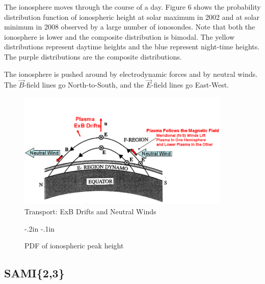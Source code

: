 \documentclass[12pt]{article}
\begin{document}
    The ionosphere moves through the course of a day. Figure 6 shows the probability distribution function of ionospheric height at solar maximum in 2002 and at solar minimum in 2008 observed by a large number of ionosondes. Note that both the ionosphere is lower and the composite distribution is bimodal. The yellow distributions represent daytime heights and the blue represent night-time heights. The purple distributions are the composite distributions.

The ionosphere is pushed around by electrodynamic forces and by neutral winds. The $\vec B$-field lines go North-to-South, and the $\vec E$-field lines go East-West.
\begin{figure}[htbp]
  \includegraphics[width=4in]{plasma}
  \caption{Transport: ExB Drifts and Neutral Winds}
\end{figure}
    \begin{figure}[htbp]
     \kern-.2in
     \kern-.1in
      \caption{PDF of ionospheric peak height}
      \label{plot}
    \end{figure}
\subsection{SAMI\{2,3\}}
  
\end{document}

